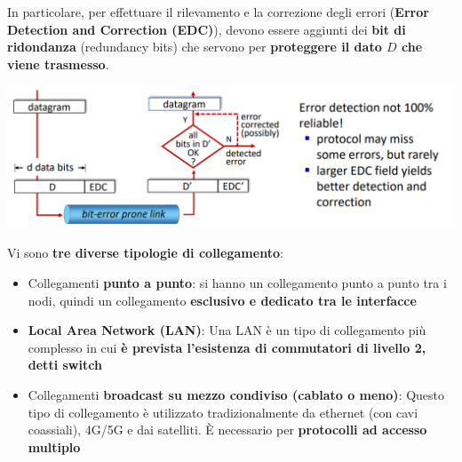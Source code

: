 \documentclass[12pt]{article}
\begin{document}
In particolare, per effettuare il rilevamento e la correzione degli errori (\textbf{Error Detection and Correction (EDC)}), devono essere aggiunti dei \textbf{bit di ridondanza} (redundancy bits) che servono per \textbf{proteggere il dato $D$ che viene trasmesso}.
\begin{center}
    \includegraphics[width =0.95\linewidth]{Images/119.png}
\end{center}
Vi sono \textbf{tre diverse tipologie di collegamento}:
\begin{itemize}
    \item Collegamenti \textbf{punto a punto}: si hanno un collegamento punto a punto tra i nodi, quindi un collegamento \textbf{esclusivo e dedicato tra le interfacce} 
    \item \textbf{Local Area Network (LAN)}: Una LAN è un tipo di collegamento più complesso in cui \textbf{è prevista l'esistenza di commutatori di livello 2, detti switch}
    \item Collegamenti \textbf{broadcast su mezzo condiviso (cablato o meno)}: Questo tipo di collegamento è utilizzato tradizionalmente da ethernet (con cavi coassiali), 4G/5G e dai satelliti. È necessario per \textbf{protocolli ad accesso multiplo}
\end{itemize}
\end{document}
